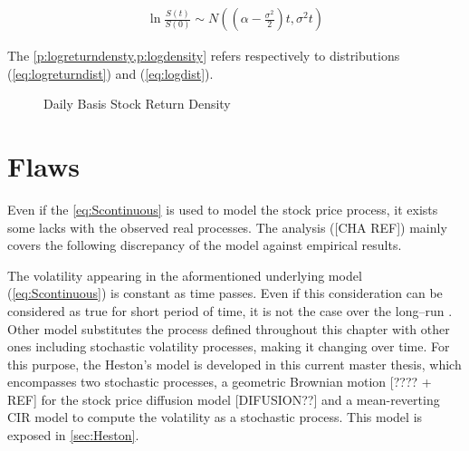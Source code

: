 \documentclass[12pt]{report}
\newcommand{\St}{S\left(t\right)}
\begin{document}
\begin{align}
\ln{\frac{\St}{S\left(0\right)}}  \sim N((\alpha - \frac{\sigma^2}{2}) t, \sigma^2 t)
\label{eq:logdist}
\end{align}

The \cref{p:logreturndensty,p:logdensity} refers respectively to distributions (\ref{eq:logreturndist}) and (\ref{eq:logdist}).

\begin{figure}[!h]
\centering 

\caption{Daily Basis Stock Return Density}
\label{p:logdensity}
\end{figure}

\section{Flaws}
\label{sec:Flaws}

Even if the \cref{eq:Scontinuous} is used to model the stock price process, it exists some lacks with the observed real processes. The analysis ([CHA REF]) mainly covers the following discrepancy of the model against empirical results.
  
The volatility appearing in the aformentioned underlying model (\ref{eq:Scontinuous}) is constant as time passes.
Even if this consideration can be considered as true for short period of time, it is not the case over the long--run \citet{teneng2011limitations}.
Other model substitutes the process defined throughout this chapter with other ones including stochastic volatility processes, making it changing over time.
For this purpose, the Heston's model is developed in this current master thesis, which encompasses two stochastic processes, a geometric Brownian motion [???? + REF] for the stock price diffusion model [DIFUSION??] and a mean-reverting CIR model to compute the volatility as a stochastic process.
This model is exposed in \cref{sec:Heston}.
\end{document}
